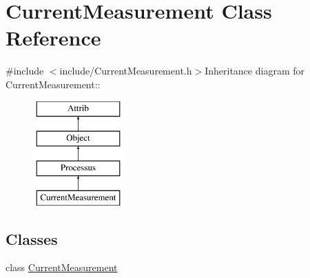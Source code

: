 \hypertarget{classCurrentMeasurement}{
\section{CurrentMeasurement Class Reference}
\label{classCurrentMeasurement}
}


{\ttfamily \#include $<$include/CurrentMeasurement.h$>$}Inheritance diagram for CurrentMeasurement::\begin{figure}[H]
\begin{center}
\leavevmode
\includegraphics[height=4cm]{classCurrentMeasurement}
\end{center}
\end{figure}
\subsection*{Classes}
\begin{DoxyCompactItemize}
\item 
class \hyperlink{classCurrentMeasurement_1_1CurrentMeasurement}{CurrentMeasurement}
\end{DoxyCompactItemize}

